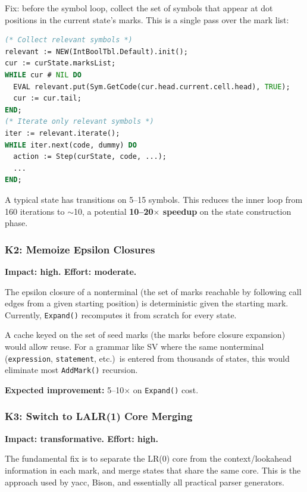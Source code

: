 \documentclass[11pt]{article}
\begin{document}
Fix: before the symbol loop, collect the set of symbols that appear at
dot positions in the current state's marks.  This is a single pass
over the mark list:

\begin{lstlisting}[language=Modula2]
(* Collect relevant symbols *)
relevant := NEW(IntBoolTbl.Default).init();
cur := curState.marksList;
WHILE cur # NIL DO
  EVAL relevant.put(Sym.GetCode(cur.head.current.cell.head), TRUE);
  cur := cur.tail;
END;
(* Iterate only relevant symbols *)
iter := relevant.iterate();
WHILE iter.next(code, dummy) DO
  action := Step(curState, code, ...);
  ...
END;
\end{lstlisting}

A typical state has transitions on 5--15 symbols.  This reduces the
inner loop from 160 iterations to $\sim$10, a potential
\textbf{10--20$\times$ speedup} on the state construction phase.

\subsubsection{K2: Memoize Epsilon Closures}

\textbf{Impact: high. \quad Effort: moderate.}

The epsilon closure of a nonterminal (the set of marks reachable by
following call edges from a given starting position) is deterministic
given the starting mark.  Currently, \texttt{Expand()} recomputes it
from scratch for every state.

A cache keyed on the set of seed marks (the marks before closure
expansion) would allow reuse.  For a grammar like SV where the same
nonterminal (\texttt{expression}, \texttt{statement}, etc.)\ is
entered from thousands of states, this would eliminate most
\texttt{AddMark()} recursion.

\textbf{Expected improvement:} 5--10$\times$ on \texttt{Expand()} cost.

\subsubsection{K3: Switch to LALR(1) Core Merging}

\textbf{Impact: transformative. \quad Effort: high.}

The fundamental fix is to separate the LR(0) core from the
context/lookahead information in each mark, and merge states that share
the same core.  This is the approach used by yacc, Bison, and
essentially all practical parser generators.
\end{document}
